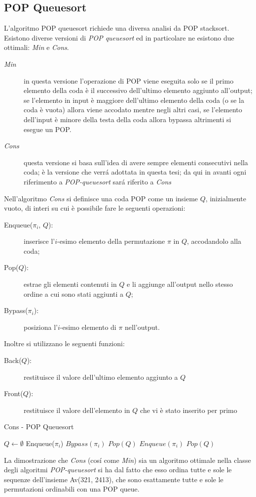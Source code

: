 \subsection{POP Queuesort}L'algoritmo POP queuesort richiede una diversa analisi da POP stacksort.\\
Esistono diverse versioni di \textit{POP queuesort} ed in particolare ne esistono due ottimali\cite{cioni2021sorting}: \textit{Min} e \textit{Cons}.
\begin{description}
	\item[\textit{Min}] in questa versione l'operazione di POP viene eseguita solo se il primo elemento della coda \`e il successivo dell'ultimo elemento aggiunto all'output; se l'elemento in input \`e maggiore dell'ultimo elemento della coda (o se la coda \`e vuota) allora viene accodato mentre negli altri casi, se l'elemento dell'input \`e minore della testa della coda allora bypassa altrimenti si esegue un POP.
	\item[\textit{Cons}] questa versione si basa sull'idea di avere sempre elementi consecutivi nella coda; \`e la versione che verr\'a adottata in questa tesi; da qui in avanti ogni riferimento a \textit{POP-queuesort} sar\'a riferito a \textit{Cons}
\end{description}
Nell'algoritmo \textit{Cons} si definisce una coda POP come un insieme $Q$, inizialmente vuoto, di interi su cui \`e possibile fare le seguenti operazioni:
\begin{description}
	\item[Enqueue($\pi_i$, $Q$):] inserisce l'$i$-esimo elemento della permutazione $\pi$ in $Q$, accodandolo alla coda;
	\item[Pop($Q$):] estrae gli elementi contenuti in $Q$ e li aggiunge all'output nello stesso ordine a cui sono stati aggiunti a $Q$;
	\item[Bypass($\pi_i$):] posiziona l'$i$-esimo elemento di $\pi$ nell'output.
\end{description}
Inoltre si utilizzano le seguenti funzioni:
\begin{description}
	\item[Back($Q$):] restituisce il valore dell'ultimo elemento aggiunto a $Q$
	\item[Front($Q$):] restituisce il valore dell'elemento in $Q$ che vi \`e stato inserito per primo
\end{description}
\begin{algorithm}[H]
   \caption{Cons - POP Queuesort}
\begin{algorithmic}[1]
\State $Q\leftarrow\emptyset$ 
		\State Enqueue($\pi_i$)
	\Else
			\State $Bypass(\pi_i)$
		\Else
			\State $Pop(Q)$
			\State $Enqueue(\pi_i)$
		\EndIf
	\EndIf
\EndFor
{}
\State $Pop(Q)$
\EndIf
\end{algorithmic}
\end{algorithm}
La dimostrazione che \textit{Cons} (cos\'i come \textit{Min}) sia un algoritmo ottimale nella classe degli algoritmi \textit{POP-queuesort} si ha dal fatto che esso ordina tutte e sole le sequenze dell'insieme Av(321, 2413), che sono esattamente tutte e sole le permutazioni ordinabili con una POP queue\cite{cioni2021sorting}.
